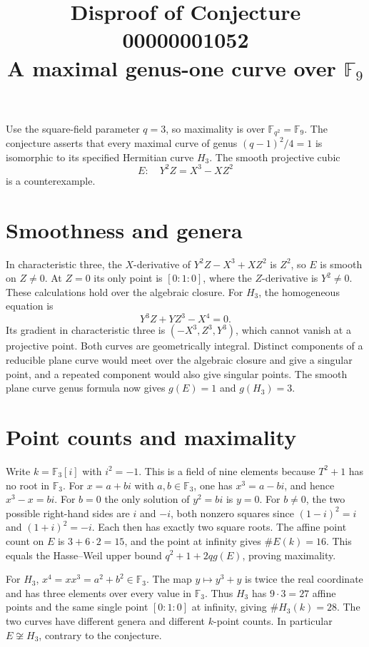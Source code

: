 \documentclass[11pt]{article}
\title{Disproof of Conjecture 00000001052\\
\large A maximal genus-one curve over \(\mathbb F_9\)}
\author{}
\date{}
\begin{document}
\maketitle

Use the square-field parameter \(q=3\), so maximality is over
\(\mathbb F_{q^2}=\mathbb F_9\). The conjecture asserts that every
maximal curve of genus \((q-1)^2/4=1\) is isomorphic to its specified
Hermitian curve \(H_3\). The smooth projective cubic
\[
  E:\quad Y^2Z=X^3-XZ^2
\]
is a counterexample.

\section*{Smoothness and genera}

In characteristic three, the \(X\)-derivative of
\(Y^2Z-X^3+XZ^2\) is \(Z^2\), so \(E\) is smooth on \(Z\ne0\).
At \(Z=0\) its only point is \([0:1:0]\), where the \(Z\)-derivative
is \(Y^2\ne0\). These calculations hold over the algebraic closure.
For \(H_3\), the homogeneous equation is
\[
  Y^3Z+YZ^3-X^4=0 .
\]
Its gradient in characteristic three is \((-X^3,Z^3,Y^3)\), which
cannot vanish at a projective point. Both curves are geometrically
integral. Distinct components of a reducible plane curve would meet
over the algebraic closure and give a singular point, and a repeated
component would also give singular points. The smooth plane curve
genus formula \cite[\S\,53.9]{stacks} now gives \(g(E)=1\) and
\(g(H_3)=3\).

\section*{Point counts and maximality}

Write \(k=\mathbb F_3[i]\) with \(i^2=-1\). This is a field of
nine elements because \(T^2+1\) has no root in \(\mathbb F_3\).
For \(x=a+bi\) with \(a,b\in\mathbb F_3\), one has \(x^3=a-bi\),
and hence \(x^3-x=bi\). For \(b=0\) the only solution of \(y^2=bi\)
is \(y=0\). For \(b\ne0\), the two possible right-hand sides are
\(i\) and \(-i\), both nonzero squares since
\((1-i)^2=i\) and \((1+i)^2=-i\). Each then has exactly two square
roots. The affine point count on \(E\) is \(3+6\cdot2=15\), and
the point at infinity gives \(\#E(k)=16\). This equals the
Hasse--Weil upper bound \(q^2+1+2qg(E)\), proving maximality.

For \(H_3\), \(x^4=x x^3=a^2+b^2\in\mathbb F_3\). The map
\(y\mapsto y^3+y\) is twice the real coordinate and has three
elements over every value in \(\mathbb F_3\). Thus \(H_3\) has
\(9\cdot3=27\) affine points and the same single point \([0:1:0]\)
at infinity, giving \(\#H_3(k)=28\). The two curves have different
genera and different \(k\)-point counts. In particular
\(E\not\cong H_3\), contrary to the conjecture.
\end{document}
